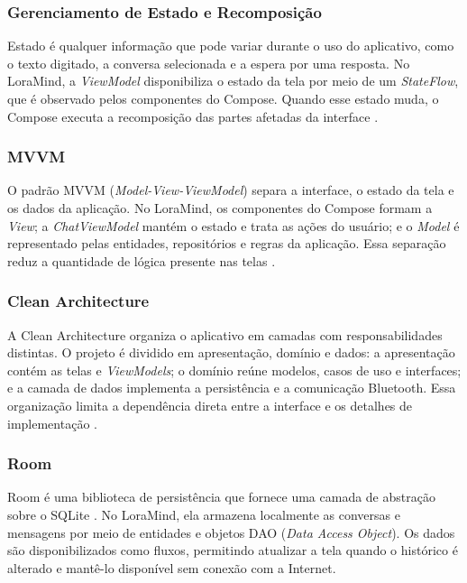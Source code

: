 \documentclass[12pt]{article}
\begin{document}
\subsubsection{Gerenciamento de Estado e Recomposição}

Estado é qualquer informação que pode variar durante o uso do aplicativo, como o texto digitado, a conversa selecionada e a espera por uma resposta. No LoraMind, a \textit{ViewModel} disponibiliza o estado da tela por meio de um \textit{StateFlow}, que é observado pelos componentes do Compose. Quando esse estado muda, o Compose executa a recomposição das partes afetadas da interface \cite{androidcomposestate2026}.

\subsubsection{MVVM}

O padrão MVVM (\textit{Model-View-ViewModel}) separa a interface, o estado da tela e os dados da aplicação. No LoraMind, os componentes do Compose formam a \textit{View}; a \textit{ChatViewModel} mantém o estado e trata as ações do usuário; e o \textit{Model} é representado pelas entidades, repositórios e regras da aplicação. Essa separação reduz a quantidade de lógica presente nas telas \cite{androidarchitecture2026}.

\subsubsection{Clean Architecture}

A Clean Architecture organiza o aplicativo em camadas com responsabilidades distintas. O projeto é dividido em apresentação, domínio e dados: a apresentação contém as telas e \textit{ViewModels}; o domínio reúne modelos, casos de uso e interfaces; e a camada de dados implementa a persistência e a comunicação Bluetooth. Essa organização limita a dependência direta entre a interface e os detalhes de implementação \cite{androidarchitecture2026}.

\subsubsection{Room}

Room é uma biblioteca de persistência que fornece uma camada de abstração sobre o SQLite \cite{androidroom2026}. No LoraMind, ela armazena localmente as conversas e mensagens por meio de entidades e objetos DAO (\textit{Data Access Object}). Os dados são disponibilizados como fluxos, permitindo atualizar a tela quando o histórico é alterado e mantê-lo disponível sem conexão com a Internet.
\end{document}
